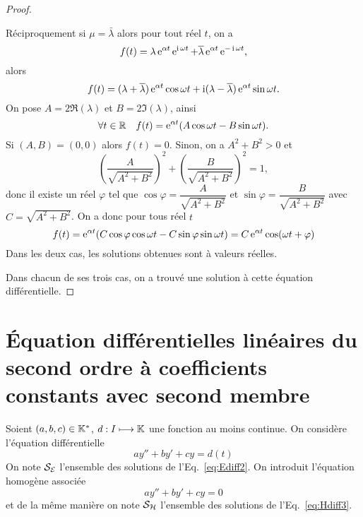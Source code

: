 \begin{proof}
\begin{itemize}
Réciproquement si $\mu=\bar{\lambda}$ alors pour tout réel $t$, on a
\begin{equation}
 f(t)=\lambda \operatorname{e}^{\alpha t} \operatorname{e}^{\operatorname{i} \omega t} + \overline{\lambda} \operatorname{e}^{\alpha t} \operatorname{e}^{-\operatorname{i}\omega t}, 
\end{equation}
alors
\begin{equation}
 f(t)=(\lambda + \overline{\lambda}) \operatorname{e}^{\alpha t} \cos \omega t + \operatorname{i}(\lambda - \overline{\lambda}) \operatorname{e}^{\alpha t}\sin \omega t. 
\end{equation}
On pose $A=2 \Re(\lambda)$ et  $B=2\Im(\lambda)$, ainsi
\begin{equation}
  \forall t \in \mathbb{R} \quad f(t)=\operatorname{e}^{\alpha t} (A \cos \omega t -B \sin \omega t).
\end{equation}
Si $(A,B)=(0,0)$ alors $f(t)=0$. Sinon, on a $A^2+B^2>0$ et 
\begin{equation}
\left(\dfrac{A}{\sqrt{A^2+B^2}} \right)^2+\left(\dfrac{B}{\sqrt{A^2+B^2}} \right)^2=1,
\end{equation}
donc il existe un réel $\varphi$ tel que $\cos \varphi=\dfrac{A}{\sqrt{A^2+B^2}}$ et $\sin \varphi = \dfrac{B}{\sqrt{A^2+B^2}}$ avec $C=\sqrt{A^2+B^2}$. On a donc pour tous réel $t$ 
\begin{equation}
f(t)=\operatorname{e}^{\alpha t} (C \cos \varphi \cos \omega t - C \sin \varphi \sin \omega t) = C \operatorname{e}^{\alpha t} \cos(\omega t + \varphi)
\end{equation}
 Dans les deux cas, les solutions obtenues sont à valeurs réelles.
  \end{itemize}
Dans chacun de ses trois cas, on a trouvé une solution à cette équation différentielle.
\end{proof}
%
\section{Équation différentielles linéaires du second ordre à coefficients constants avec second membre}
\label{sec:eqdifflinsecondordrecoefconstantsecondmembre}
Soient $(a,b,c) \in \mathbb{K}^{*}$, $d:I \longmapsto \mathbb{K}$ une fonction au moins continue. On considère l'équation différentielle
\begin{equation}
  \label{eq:Ediff2}
  ay'' + by' + cy=d(t)
\end{equation}
On note $\mathcal{S}_{\mathcal{E}}$ l'ensemble des solutions de l'Eq.~\eqref{eq:Ediff2}. On introduit l'équation homogène associée
\begin{equation}
  \label{eq:Hdiff3}
  ay''+by'+cy=0
\end{equation}
et de la même manière on note $\mathcal{S}_{\mathcal{H}}$ l'ensemble des solutions de l'Eq.~\eqref{eq:Hdiff3}.
